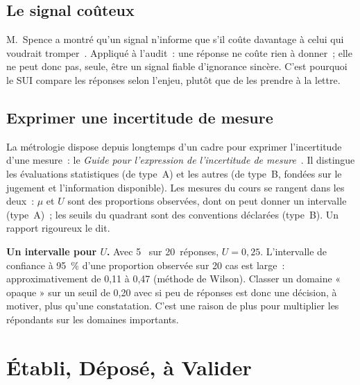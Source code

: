 \subsection{Le signal coûteux}

M.~Spence a montré qu'un signal n'informe que s'il coûte davantage à celui
qui voudrait tromper~\cite{spence1973signaling}. Appliqué à l'audit~: une
réponse \NEK{} ne coûte rien à donner~; elle ne peut donc pas, seule, être
un signal fiable d'ignorance sincère. C'est pourquoi le SUI compare les
réponses selon l'enjeu, plutôt que de les prendre à la lettre.

\subsection{Exprimer une incertitude de mesure}

La métrologie dispose depuis longtemps d'un cadre pour exprimer
l'incertitude d'une mesure~: le \emph{Guide pour l'expression de
l'incertitude de mesure}~\cite{jcgm2008gum}. Il distingue les évaluations
statistiques (de type~A) et les autres (de type~B, fondées sur le jugement
et l'information disponible). Les mesures du cours se rangent dans les
deux~: $\mu$ et $U$ sont des proportions observées, dont on peut donner un
intervalle (type~A)~; les seuils du quadrant sont des conventions déclarées
(type~B). Un rapport rigoureux le dit.

\begin{boxinfo}
\textbf{Un intervalle pour $U$.} Avec 5~\NEK{} sur 20~réponses, $U = 0{,}25$.
L'intervalle de confiance à 95~\% d'une proportion observée sur 20 cas est
large~: approximativement de 0,11 à 0,47 (méthode de Wilson). Classer un
domaine « opaque » sur un seuil de 0,20 avec si peu de réponses est donc
une décision, à motiver, plus qu'une constatation. C'est une raison de
plus pour multiplier les répondants sur les domaines importants.
\end{boxinfo}

\section{Établi, Déposé, à Valider}
\label{sec:c31-statut}


